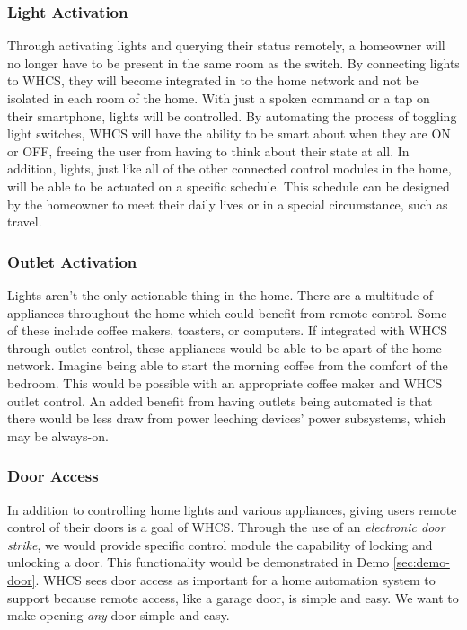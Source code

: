 \subsubsection{Light Activation}
Through activating lights and querying their status remotely, a homeowner will
no longer have to be present in the same room as the switch.  By connecting
lights to WHCS, they will become integrated in to the home network and not be
isolated in each room of the home.  With just a spoken command or a tap on
their smartphone, lights will be controlled.  By automating the process of
toggling light switches, WHCS will have the ability to be smart about when they
are ON or OFF, freeing the user from having to think about their state at all.
In addition, lights, just like all of the other connected control modules in
the home, will be able to be actuated on a specific schedule. This schedule
 can be designed by the homeowner
to meet their daily lives or in a special circumstance, such as travel.

\subsubsection{Outlet Activation}
Lights aren't the only actionable thing in the home. There are a multitude of
appliances throughout the home which could benefit from remote control. Some
of these include coffee makers, toasters, or computers. If integrated with WHCS through outlet control, these appliances
would be able to be apart of the home network. Imagine being able to start the
morning coffee from the comfort of the bedroom. This would be possible with an
appropriate coffee maker and WHCS outlet control. An added benefit from having
outlets being automated is that there would be less draw from power leeching
devices' power subsystems, which may be always-on. 

\subsubsection{Door Access}
In addition to controlling home lights and various appliances, giving users
remote control of their doors is  a goal of WHCS. Through the use of an
\emph{electronic door strike}, we would provide specific control module the
capability of locking and unlocking a door. This functionality would be
demonstrated in Demo \ref{sec:demo-door}. WHCS sees door access as important
for a home automation system to support because remote access, like a garage
door, is simple and easy. We want to make opening \emph{any} door simple and
easy.

